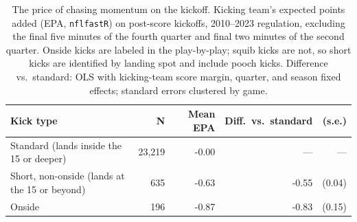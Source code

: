\begin{table}[htbp]
\centering
\caption{\label{tab:kickoff} The price of chasing momentum on the kickoff. Kicking team's expected points added (EPA, \texttt{nflfastR}) on post-score kickoffs, 2010--2023 regulation, excluding the final five minutes of the fourth quarter and final two minutes of the second quarter. Onside kicks are labeled in the play-by-play; squib kicks are not, so short kicks are identified by landing spot and include pooch kicks. Difference vs.\ standard: OLS with kicking-team score margin, quarter, and season fixed effects; standard errors clustered by game.}
\begin{tabular}{lrrrr}
\toprule
Kick type & N & Mean EPA & Diff.\ vs.\ standard & (s.e.) \\
\midrule
Standard (lands inside the 15 or deeper) & 23,219 & -0.00 & --- & --- \\
Short, non-onside (lands at the 15 or beyond) & 635 & -0.63 & -0.55 & (0.04) \\
Onside & 196 & -0.87 & -0.83 & (0.15) \\
\bottomrule
\end{tabular}
\end{table}
